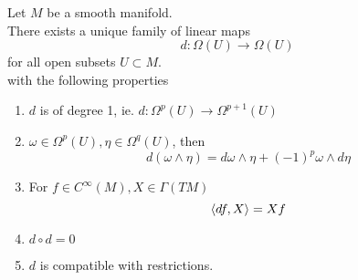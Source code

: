 \documentclass[../main.tex]{subfiles}
\begin{document}
\begin{thm}
	Let $M$ be a smooth manifold.\\
	There exists a unique family of linear maps
	\[ 
	d: \Omega( U) \to \Omega( U) 
	\]
	for all open subsets $U \subset M$.\\
with the following properties
\begin{enumerate}
\item $d$ is of degree 1, ie. $d: \Omega^{p}( U) \to \Omega^{p+1}( U) $ 
\item $\omega\in \Omega^{p }( U) , \eta\in \Omega^{q}( U) $, then
	\[ 
	d( \omega\wedge \eta) = d \omega\wedge \eta + ( -1)^{p}\omega\wedge d \eta
\]
\item For $f\in C^{ \infty }( M) , X \in \Gamma( TM) $ 
	\[ 
		\left\langle df, X\right\rangle= Xf
	\]

\item $d\circ d =0$ 
\item $d$ is compatible with restrictions.
	
	
\end{enumerate}

\end{thm}
\end{document}
